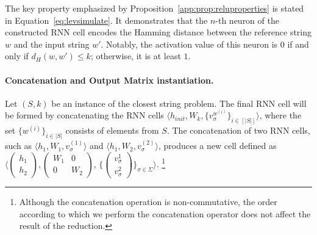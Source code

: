 The key property emphasized by Proposition~\ref{app:prop:reluproperties} is stated in Equation~\ref{eq:levsimulate}. It demonstrates that the $n$-th neuron of the constructed RNN cell encodes the Hamming distance between the reference string $w$ and the input string $w'$. Notably, the activation value of this neuron is $0$ if and only if $d_{H}(w,w') \leq k$; otherwise, it is at least $1$.


\paragraph{Concatenation and Output Matrix instantiation.} 

Let $(S, k)$ be an instance of the closest string problem. The final RNN cell will be formed by concatenating the RNN cells $\langle h_{init}, W_{k}, \{v_{\sigma}^{w^{(i)}}\}_{i \in [|S|]}\rangle$, where the set $\{w^{(i)}\}_{i \in |S|}$ consists of elements from $S$. The concatenation of two RNN cells, such as $\langle h_{1}, W_{1}, v_{\sigma}^{(1)}\rangle$ and $\langle h_{1}, W_{2}, v_{\sigma}^{(2)}\rangle$, produces a new cell defined as
$\Big\langle \begin{pmatrix}
    h_{1} \\h_{2}
\end{pmatrix}, \begin{pmatrix}
    W_{1} & 0 \\ 
    0 & W_{2}
\end{pmatrix}$, $\{ \begin{pmatrix} v_{\sigma}^{1} \\ 
v_{\sigma}^{2}
\end{pmatrix}
\}_{\sigma \in \Sigma}\Big\rangle$. \footnote{Although the concatenation operation is non-commutative, the order according to which we perform the concatenation operator does not affect the result of the reduction.} \\

